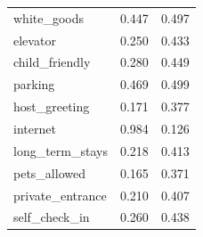 \begin{table}[H]
{\begin{tabular}{lrr}
white\_goods            &     0.447 &        0.497 \\
elevator               &     0.250 &        0.433 \\
child\_friendly         &     0.280 &        0.449 \\
parking                &     0.469 &        0.499 \\
host\_greeting          &     0.171 &        0.377 \\
internet               &     0.984 &        0.126 \\
long\_term\_stays        &     0.218 &        0.413 \\
pets\_allowed           &     0.165 &        0.371 \\
private\_entrance       &     0.210 &        0.407 \\
self\_check\_in          &     0.260 &        0.438 \\
\bottomrule
\end{tabular}
}
\end{table}

